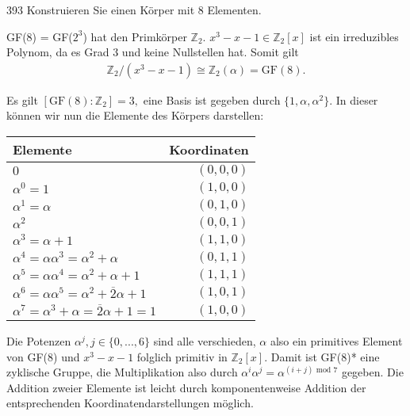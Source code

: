 \begin{algebraUE}{393}
  Konstruieren Sie einen Körper mit 8 Elementen.
\end{algebraUE}

\begin{solution}

  GF(8) = GF($2^3$) hat den Primkörper $\mathbb{Z}_2.$ $x^3-x-1 \in \mathbb{Z}_2[x]$ ist ein irreduzibles Polynom, da es Grad 3 und keine Nullstellen hat. Somit gilt
  \begin{align}
      \mathbb{Z}_2/(x^3-x-1) \cong \mathbb{Z}_2(\alpha) = \text{GF}(8).
  \end{align}

  Es gilt $[\text{GF}(8) : \mathbb{Z}_2] = 3,$ eine Basis ist gegeben durch $\{1, \alpha, \alpha^2\}.$ In dieser können wir nun die Elemente des Körpers darstellen:
  \begin{center}
  \begin{tabular}[h]{l|r}
  Elemente & Koordinaten \\
  \hline
  $0$ & $(0, 0, 0)$ \\
  $\alpha^0 = 1$ & $(1, 0, 0)$ \\
  $\alpha^1 = \alpha$ & $(0, 1, 0)$ \\
  $\alpha^2$ & $(0, 0, 1)$ \\
  $\alpha^3 = \alpha + 1$ & $(1, 1, 0)$ \\
  $\alpha^4 = \alpha\alpha^3 = \alpha^2 + \alpha$ & $(0, 1, 1)$ \\
  $\alpha^5 = \alpha\alpha^4 = \alpha^2 + \alpha + 1$ & $(1, 1, 1)$ \\
  $\alpha^6 = \alpha\alpha^5 = \alpha^2 + \overline2\alpha + 1$ & $(1, 0, 1)$ \\
  $\alpha^7 = \alpha^3 + \alpha = \overline2\alpha + 1 = 1$ & $(1, 0, 0)$
  \end{tabular}
  \end{center}

  Die Potenzen $\alpha^j, j \in \{0, ..., 6\}$ sind alle verschieden, $\alpha$ also ein primitives Element von GF(8) und $x^3 - x - 1$ folglich primitiv in $\mathbb{Z}_2[x].$ Damit ist GF(8)* eine zyklische Gruppe, die Multiplikation also durch $\alpha^i \alpha^j = \alpha^{(i+j) \text{~mod~} 7}$ gegeben. Die Addition zweier Elemente ist leicht durch komponentenweise Addition der entsprechenden Koordinatendarstellungen möglich.

\end{solution}
